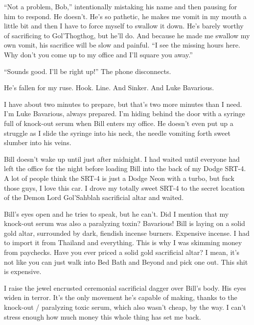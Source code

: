 ``Not a problem, Bob,'' intentionally mistaking his name and then
pausing for him to respond. He doesn't. He's so pathetic, he makes
me vomit in my mouth a little bit and then I have to force myself
to swallow it down. He's barely worthy of sacrificing to
Gol'Thogthog, but he'll do. And because he made me swallow my own
vomit, his sacrifice will be slow and painful. ``I see the missing
hours here. Why don't you come up to my office and I'll square you
away.''



``Sounds good. I'll be right up!'' The phone disconnects.



He's fallen for my ruse. Hook. Line. And Sinker. And Luke
Bavarious.



I have about two minutes to prepare, but that's two more minutes
than I need. I'm Luke Bavarious, always prepared. I'm hiding behind
the door with a syringe full of knock-out serum when Bill enters my
office. He doesn't even put up a struggle as I slide the syringe
into his neck, the needle vomiting forth sweet slumber into his
veins.



Bill doesn't wake up until just after midnight. I had waited until
everyone had left the office for the night before loading Bill into
the back of my Dodge SRT-4. A lot of people think the SRT-4 is just
a Dodge Neon with a turbo, but fuck those guys, I love this car. I
drove my totally sweet SRT-4 to the secret location of the Demon
Lord Gol'Sahblah sacrificial altar and waited.



Bill's eyes open and he tries to speak, but he can't. Did I mention
that my knock-out serum was also a paralyzing toxin? Bavarious!
Bill is laying on a solid gold altar, surrounded by dark, fiendish
incense burners. Expensive incense. I had to import it from
Thailand and everything. This is why I was skimming money from
paychecks. Have you ever priced a solid gold sacrificial altar? I
mean, it's not like you can just walk into Bed Bath and Beyond and
pick one out. This shit is expensive.



I raise the jewel encrusted ceremonial sacrificial dagger over
Bill's body. His eyes widen in terror. It's the only movement he's
capable of making, thanks to the knock-out / paralyzing toxic serum,
which also wasn't cheap, by the way. I can't stress enough how much
money this whole thing has set me back.




